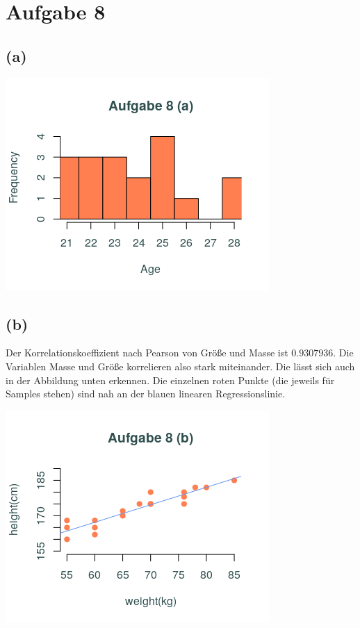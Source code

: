\documentclass[a4paper]{scrartcl}
\begin{document}
\section*{Aufgabe 8}
\subsection*{(a)}
\begin{center}
	\includegraphics*[scale = 1]{aufgabe_8_a.png}
\end{center}


\subsection*{(b)}
Der Korrelationskoeffizient nach Pearson von Größe und Masse ist $0.9307936$. Die Variablen Masse und Größe korrelieren also stark miteinander. Die lässt sich auch in der Abbildung unten erkennen. Die einzelnen roten Punkte (die jeweils für Samples stehen) sind nah an der blauen linearen Regressionslinie.
\begin{center}
	\includegraphics*[scale = 1]{aufgabe_8_b.png}
\end{center}
\end{document}
